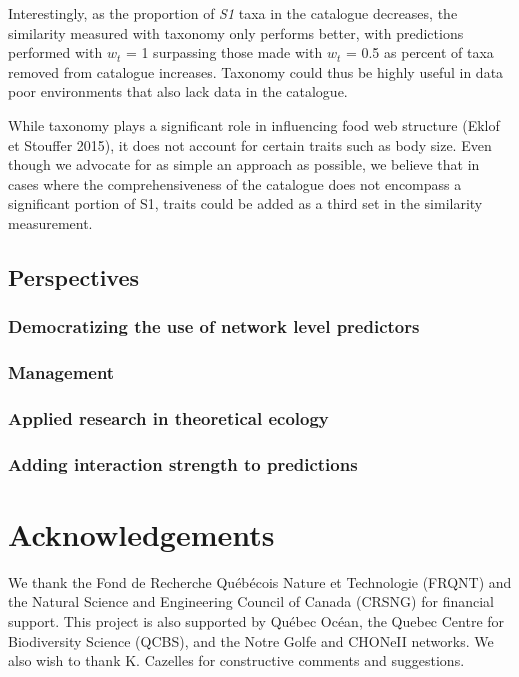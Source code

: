 \documentclass[letterpaper]{article}
\begin{document}
 Interestingly, as the proportion of \textit{S1} taxa in the catalogue decreases, the similarity measured with taxonomy only performs better, with predictions performed with $w_t$ = 1 surpassing those made with $w_t$ = 0.5 as percent of taxa removed from catalogue increases. Taxonomy could thus be highly useful in data poor environments that also lack data in the catalogue.

While taxonomy plays a significant role in influencing food web structure (Eklof et Stouffer 2015), it does not account for certain traits such as body size. Even though we advocate for as simple an approach as possible, we believe that in cases where the comprehensiveness of the catalogue does not encompass a significant portion of S1, traits could be added as a third set in the similarity measurement.


\subsection{Perspectives}
\subsubsection{Democratizing the use of network level predictors}
\subsubsection{Management}
\subsubsection{Applied research in theoretical ecology}
\subsubsection{Adding interaction strength to predictions}












\section{Acknowledgements}
We thank the Fond de Recherche Québécois Nature et Technologie (FRQNT) and the Natural Science and Engineering Council of Canada (CRSNG) for financial support. This project is also supported by Québec Océan, the Quebec Centre for Biodiversity Science (QCBS), and the Notre Golfe and CHONeII networks. We also wish to thank K. Cazelles for constructive comments and suggestions.
\end{document}
